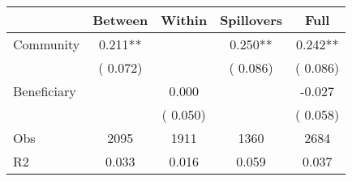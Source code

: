 
\begin{tabular}{l*{4}{c}}\hline&\multicolumn{1}{c}{Between}&\multicolumn{1}{c}{Within}&\multicolumn{1}{c}{Spillovers}&\multicolumn{1}{c}{Full}\\ \hline
 Community             &              0.211**      &                                               &        0.250** &         0.242**                            \\ 
                               &        (       0.072)           &                                       &       (       0.086)     &      (       0.086)                                           \\ 
 Beneficiary   &                                               &        0.000    &                                &            -0.027                            \\ 
                               &                                               & (       0.050)                  &                                        &      (       0.058)                                           \\ 
\hline                                                                                                                                                                                                                                            
 Obs                   &               2095               &       1911                       &       1360                &              2684                                               \\ 
 R2                    &                      0.033              &              0.016                      &              0.059               &                     0.037                                              \\ 
\hline \end{tabular}                                                                                                                                                                                                              